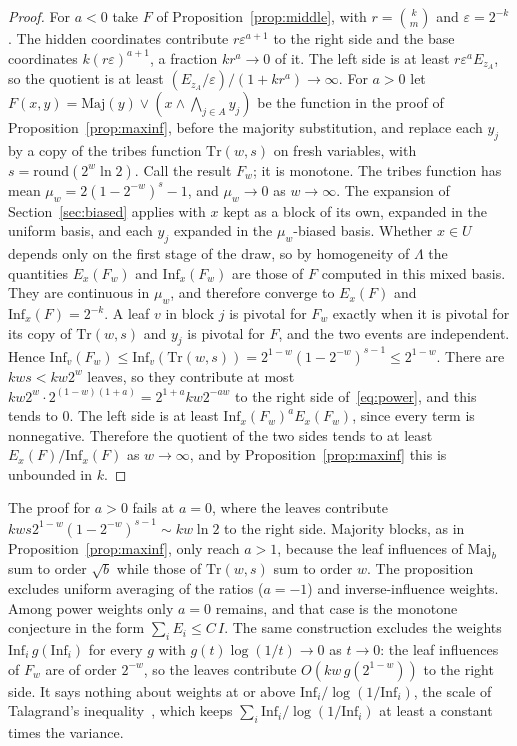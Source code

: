 \documentclass[11pt]{amsart}
\theoremstyle{definition}
\theoremstyle{remark}
\newcommand{\Inf}{\mathrm{Inf}}
\begin{document}
\begin{proof}
For $a<0$ take $F$ of Proposition~\ref{prop:middle}, with $r=\binom km$ and $\varepsilon=2^{-k}$. The hidden coordinates
contribute $r\varepsilon^{a+1}$ to the right side and the base coordinates $k(r\varepsilon)^{a+1}$, a fraction $kr^a\to0$ of it.
The left side is at least $r\varepsilon^{a}E_{z_A}$, so the quotient is at least $(E_{z_A}/\varepsilon)/(1+kr^a)\to\infty$.
For $a>0$ let $F(x,y)=\mathrm{Maj}(y)\vee(x\wedge\bigwedge_{j\in A}y_j)$ be the function in the proof of
Proposition~\ref{prop:maxinf}, before the majority substitution, and replace each $y_j$ by a copy of the tribes
function $\mathrm{Tr}(w,s)$ on fresh variables, with $s=\mathrm{round}(2^w\ln2)$. Call the result $F_w$; it is monotone. The
tribes function
has mean $\mu_w=2(1-2^{-w})^s-1$, and $\mu_w\to0$ as $w\to\infty$. The expansion of Section~\ref{sec:biased} applies with $x$ kept
as a block of its own, expanded in the uniform basis, and each $y_j$ expanded in the $\mu_w$-biased basis. Whether
$x\in U$ depends only on the first stage of the draw, so by homogeneity of $\Lambda$ the quantities $E_x(F_w)$ and
$\Inf_x(F_w)$ are those of $F$ computed in this mixed basis. They are continuous in $\mu_w$, and therefore converge to
$E_x(F)$ and $\Inf_x(F)=2^{-k}$. A leaf $v$ in block $j$ is pivotal for $F_w$ exactly when it is pivotal for its copy
of $\mathrm{Tr}(w,s)$ and $y_j$ is pivotal for $F$, and the two events are independent. Hence
$\Inf_v(F_w)\le\Inf_v(\mathrm{Tr}(w,s))=2^{1-w}(1-2^{-w})^{s-1}\le2^{1-w}$. There are $kws<kw2^w$ leaves, so they contribute at
most $kw2^w\cdot2^{(1-w)(1+a)}=2^{1+a}kw2^{-aw}$ to the right side of~\eqref{eq:power}, and this tends to $0$. The left
side is at least $\Inf_x(F_w)^aE_x(F_w)$, since every term is nonnegative. Therefore the quotient of the two sides
tends to at least $E_x(F)/\Inf_x(F)$ as $w\to\infty$, and by Proposition~\ref{prop:maxinf} this is unbounded in $k$.
\end{proof}

The proof for $a>0$ fails at $a=0$, where the leaves contribute $kws2^{1-w}(1-2^{-w})^{s-1}\sim kw\ln2$ to the right
side. Majority blocks, as in Proposition~\ref{prop:maxinf}, only reach $a>1$, because the leaf influences of
$\mathrm{Maj}_b$ sum to order $\sqrt b$ while those of $\mathrm{Tr}(w,s)$ sum to order $w$. The proposition excludes uniform
averaging of the ratios ($a=-1$) and inverse-influence weights. Among power weights only $a=0$ remains, and that case
is the monotone conjecture in the form $\sum_iE_i\le C\,I$. The same construction excludes the weights
$\Inf_i\,g(\Inf_i)$ for every $g$ with $g(t)\log(1/t)\to0$ as $t\to0$: the leaf influences of $F_w$ are of order
$2^{-w}$, so the leaves contribute $O(kw\,g(2^{1-w}))$ to the right side. It says nothing about weights at or above
$\Inf_i/\log(1/\Inf_i)$, the scale of Talagrand's inequality~\cite{Tal}, which keeps $\sum_i\Inf_i/\log(1/\Inf_i)$ at
least a constant times the variance.
\end{document}
